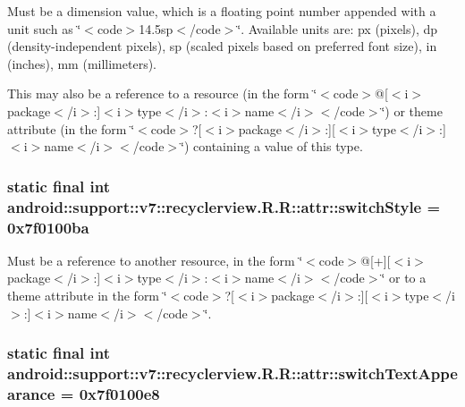 Must be a dimension value, which is a floating point number appended with a unit such as \char`\"{}$<$code$>$14.5sp$<$/code$>$\char`\"{}. Available units are: px (pixels), dp (density-independent pixels), sp (scaled pixels based on preferred font size), in (inches), mm (millimeters). 

This may also be a reference to a resource (in the form \char`\"{}$<$code$>$@\mbox{[}$<$i$>$package$<$/i$>$:\mbox{]}$<$i$>$type$<$/i$>$:$<$i$>$name$<$/i$>$$<$/code$>$\char`\"{}) or theme attribute (in the form \char`\"{}$<$code$>$?\mbox{[}$<$i$>$package$<$/i$>$:\mbox{]}\mbox{[}$<$i$>$type$<$/i$>$:\mbox{]}$<$i$>$name$<$/i$>$$<$/code$>$\char`\"{}) containing a value of this type. \hypertarget{classandroid_1_1support_1_1v7_1_1recyclerview_1_1_r_1_1attr_5bd3d35de35a6313a0ef587f480df0f0}{
\subsubsection[{switchStyle}]{\setlength{\rightskip}{0pt plus 5cm}static final int android::support::v7::recyclerview.R.R::attr::switchStyle = 0x7f0100ba}}
\label{classandroid_1_1support_1_1v7_1_1recyclerview_1_1_r_1_1attr_5bd3d35de35a6313a0ef587f480df0f0}


Must be a reference to another resource, in the form \char`\"{}$<$code$>$@\mbox{[}+\mbox{]}\mbox{[}$<$i$>$package$<$/i$>$:\mbox{]}$<$i$>$type$<$/i$>$:$<$i$>$name$<$/i$>$$<$/code$>$\char`\"{} or to a theme attribute in the form \char`\"{}$<$code$>$?\mbox{[}$<$i$>$package$<$/i$>$:\mbox{]}\mbox{[}$<$i$>$type$<$/i$>$:\mbox{]}$<$i$>$name$<$/i$>$$<$/code$>$\char`\"{}. \hypertarget{classandroid_1_1support_1_1v7_1_1recyclerview_1_1_r_1_1attr_90d2ce696325fc72e55ac335cf55f053}{
\subsubsection[{switchTextAppearance}]{\setlength{\rightskip}{0pt plus 5cm}static final int android::support::v7::recyclerview.R.R::attr::switchTextAppearance = 0x7f0100e8}}
\label{classandroid_1_1support_1_1v7_1_1recyclerview_1_1_r_1_1attr_90d2ce696325fc72e55ac335cf55f053}


